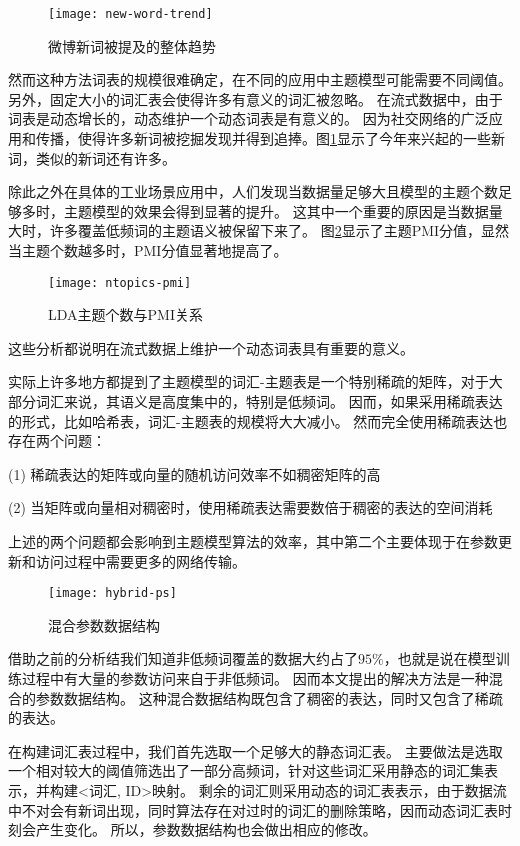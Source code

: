 \begin{figure}[htb]\centering
\texttt{[image: new-word-trend]}
\caption{微博新词被提及的整体趋势}
\label{fig:new-word-trend}       %
\end{figure}

然而这种方法词表的规模很难确定，在不同的应用中主题模型可能需要不同阈值。
另外，固定大小的词汇表会使得许多有意义的词汇被忽略。
在流式数据中，由于词表是动态增长的，动态维护一个动态词表是有意义的。
因为社交网络的广泛应用和传播，使得许多新词被挖掘发现并得到追捧。图\ref{fig:new-word-trend}显示了今年来兴起的一些新词，类似的新词还有许多。

除此之外在具体的工业场景应用中，人们发现当数据量足够大且模型的主题个数足够多时，主题模型的效果会得到显著的提升。
这其中一个重要的原因是当数据量大时，许多覆盖低频词的主题语义被保留下来了\cite{Peacock}。
图\ref{fig:ntopics-pmi}显示了主题PMI分值，显然当主题个数越多时，PMI分值显著地提高了。

\begin{figure}[htb]\centering
\texttt{[image: ntopics-pmi]}
\caption{LDA主题个数与PMI关系}
\label{fig:ntopics-pmi}       %
\end{figure}

这些分析都说明在流式数据上维护一个动态词表具有重要的意义。

实际上许多地方都提到了主题模型的词汇-主题表是一个特别稀疏的矩阵，对于大部分词汇来说，其语义是高度集中的，特别是低频词。
因而，如果采用稀疏表达的形式，比如哈希表，词汇-主题表的规模将大大减小。
然而完全使用稀疏表达也存在两个问题：

(1) 稀疏表达的矩阵或向量的随机访问效率不如稠密矩阵的高

(2) 当矩阵或向量相对稠密时，使用稀疏表达需要数倍于稠密的表达的空间消耗

上述的两个问题都会影响到主题模型算法的效率，其中第二个主要体现于在参数更新和访问过程中需要更多的网络传输。


\begin{figure}[htb]\centering
\texttt{[image: hybrid-ps]}
\caption{混合参数数据结构}
\label{fig:hybrid-ps}       %
\end{figure}

借助之前的分析结我们知道非低频词覆盖的数据大约占了$95\%$，也就是说在模型训练过程中有大量的参数访问来自于非低频词。
因而本文提出的解决方法是一种混合的参数数据结构。
这种混合数据结构既包含了稠密的表达，同时又包含了稀疏的表达。

在构建词汇表过程中，我们首先选取一个足够大的静态词汇表。
主要做法是选取一个相对较大的阈值筛选出了一部分高频词，针对这些词汇采用静态的词汇集表示，并构建<词汇, ID>映射。
剩余的词汇则采用动态的词汇表表示，由于数据流中不对会有新词出现，同时算法存在对过时的词汇的删除策略，因而动态词汇表时刻会产生变化。
所以，参数数据结构也会做出相应的修改。

